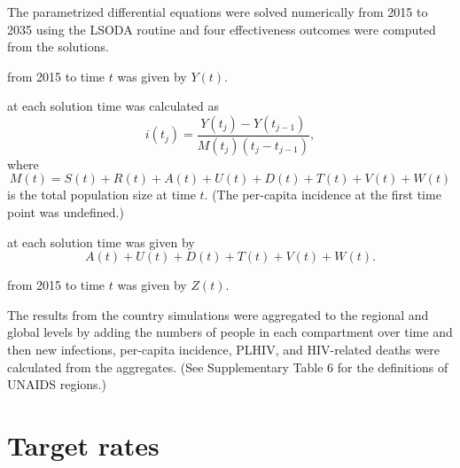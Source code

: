 \documentclass{article}
\begin{document}
The parametrized differential equations were solved numerically from
2015 to 2035 using the LSODA
routine\cite{odepack, scipy, medlock2016-git} and four effectiveness
outcomes were computed from the solutions.
\begin{description}[labelsep=0.6ex]
\item[Cumulative new infections] from 2015 to time $t$ was given by
  $Y(t)$.

\item[Per-capita incidence] at each solution time was calculated as
  \begin{equation}
    i(t_j) = \frac{Y(t_j) - Y(t_{j - 1})}{M(t_j) (t_j - t_{j - 1})},
  \end{equation}
  where
  \begin{equation}
    M(t) = S(t) + R(t) + A(t) + U(t) + D(t) + T(t) + V(t) + W(t)
  \end{equation}
  is the total population size at time $t$.  (The per-capita incidence
  at the first time point was undefined.)

\item[PLHIV] at each solution time was given by
  \begin{equation}
    A(t) + U(t) + D(t) + T(t) + V(t) + W(t).
  \end{equation}

\item[Cumulative AIDS-related deaths] from 2015 to time $t$ was given
  by $Z(t)$.

\end{description}

The results from the country simulations were aggregated to the
regional and global levels by adding the numbers of people in each
compartment over time and then new infections, per-capita incidence,
PLHIV, and HIV-related deaths were calculated from the aggregates.
(See Supplementary Table 6 for the definitions of UNAIDS regions.)


\section{Target rates}
\label{targets}
\end{document}
